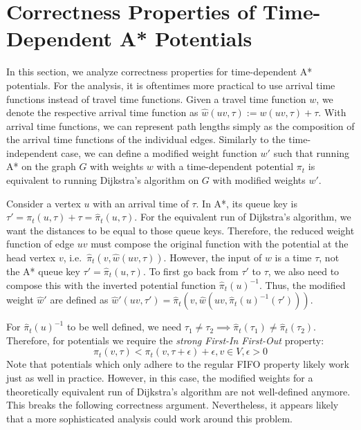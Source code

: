 \documentclass[a4paper,UKenglish,cleveref, autoref, thm-restate,anonymous]{lipics-v2021}
\begin{document}
\section{Correctness Properties of Time-Dependent A* Potentials}\label{sec:appendix:correctness}

In this section, we analyze correctness properties for time-dependent A* potentials.
For the analysis, it is oftentimes more practical to use arrival time functions instead of travel time functions.
Given a travel time function $w$, we denote the respective arrival time function as $\hat{w}(uv, \tau) := w(uv, \tau) + \tau$.
With arrival time functions, we can represent path lengths simply as the composition of the arrival time functions of the individual edges.
Similarly to the time-independent case, we can define a modified weight function $w'$ such that running A* on the graph $G$ with weights $w$ with a time-dependent potential $\pi_t$ is equivalent to running Dijkstra's algorithm on $G$ with modified weights $w'$.

Consider a vertex $u$ with an arrival time of $\tau$.
In A*, its queue key is $\tau' = \pi_t(u, \tau) + \tau = \hat{\pi}_t(u, \tau)$.
For the equivalent run of Dijkstra's algorithm, we want the distances to be equal to those queue keys.
Therefore, the reduced weight function of edge $uv$ must compose the original function with the potential at the head vertex $v$, i.e.\ $\hat{\pi}_t(v, \hat{w}(uv, \tau))$.
However, the input of $w$ is a time $\tau$, not the A* queue key $\tau' = \hat{\pi}_t(u, \tau)$.
To first go back from $\tau'$ to $\tau$, we also need to compose this with the inverted potential function $\hat{\pi}_t(u)^{-1}$.
Thus, the modified weight $\hat{w}'$ are defined as $\hat{w}'(uv, \tau') = \hat{\pi}_t(v, \hat{w}(uv, \hat{\pi}_t(u)^{-1}(\tau')))$.

For $\hat{\pi}_t(u)^{-1}$ to be well defined, we need $\tau_1 \neq \tau_2 \implies \hat{\pi}_t(\tau_1) \neq \hat{\pi}_t(\tau_2)$.
Therefore, for potentials we require the \emph{strong First-In First-Out} property:
\[
\pi_t(v, \tau) < \pi_t(v, \tau + \epsilon) + \epsilon, v \in V, \epsilon > 0
\]
Note that potentials which only adhere to the regular FIFO property likely work just as well in practice.
However, in this case, the modified weights for a theoretically equivalent run of Dijkstra's algorithm are not well-defined anymore.
This breaks the following correctness argument.
Nevertheless, it appears likely that a more sophisticated analysis could work around this problem.
\end{document}
